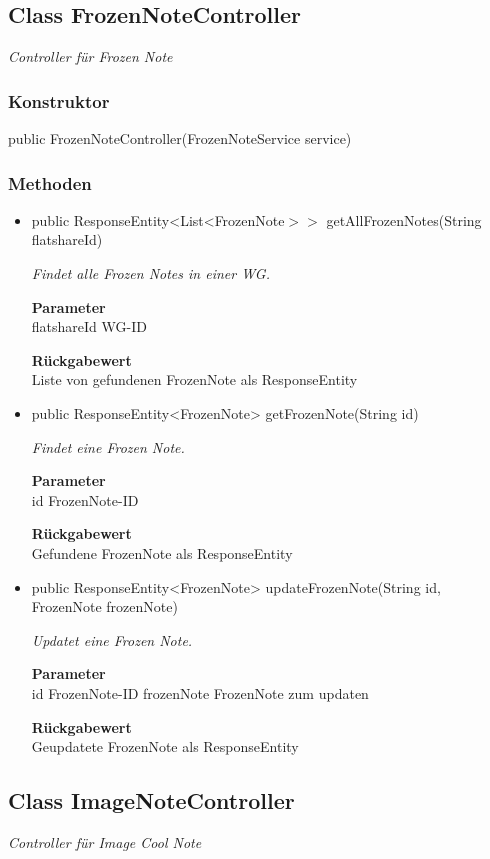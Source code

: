 \documentclass[a4paper]{scrreprt}
\begin{document}
    \subsection{Class FrozenNoteController}
    \textit{Controller für Frozen Note}
    \subsubsection{Konstruktor}
    public FrozenNoteController(FrozenNoteService service)
    \subsubsection{Methoden}
    \begin{itemize}
    	\item{public ResponseEntity<List<FrozenNote$>>$ getAllFrozenNotes(String flatshareId)}
    	
    	\textit{Findet alle Frozen Notes in einer WG.}
    	
    	\textbf{Parameter} \\
    	flatshareId WG-ID
    	
    	\textbf{Rückgabewert} \\
    	Liste von gefundenen FrozenNote als ResponseEntity        \item{public ResponseEntity<FrozenNote> getFrozenNote(String id)}
    	
    	\textit{Findet eine Frozen Note.}
    	
    	\textbf{Parameter} \\
    	id FrozenNote-ID
    	
    	\textbf{Rückgabewert} \\
    	Gefundene FrozenNote als ResponseEntity        \item{public ResponseEntity<FrozenNote> updateFrozenNote(String id, FrozenNote frozenNote)}
    	
    	\textit{Updatet eine Frozen Note.}
    	
    	\textbf{Parameter} \\
    	id FrozenNote-ID
    	frozenNote FrozenNote zum updaten
    	
    	\textbf{Rückgabewert} \\
    	Geupdatete FrozenNote als ResponseEntity
    \end{itemize}
    \subsection{Class ImageNoteController}
    \textit{Controller für Image Cool Note}
\end{document}

